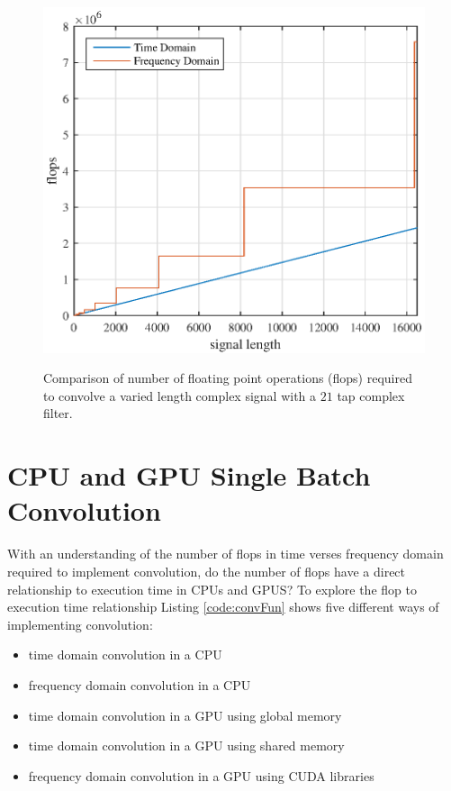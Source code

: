 \begin{figure}
	\caption{Comparison of number of floating point operations (flops) required to convolve a varied length complex signal with a $21$ tap complex filter.}
	\centering\includegraphics[width=5in]{figures/gpu_intro/Theory21Tap_flops.eps}
	\label{fig:Theory21Tap_flops}
\end{figure}



\section{CPU and GPU Single Batch Convolution}
\label{sec:cuda_convolution_single}
With an understanding of the number of flops in time verses frequency domain required to implement convolution,
do the number of flops have a direct relationship to execution time in CPUs and GPUS?
To explore the flop to execution time relationship Listing \ref{code:convFun} shows five different ways of implementing convolution:
\begin{itemize}
  \item time domain convolution in a CPU
  \item frequency domain convolution in a CPU
  \item time domain convolution in a GPU using global memory
  \item time domain convolution in a GPU using shared memory
  \item frequency domain convolution in a GPU using CUDA libraries
\end{itemize}

